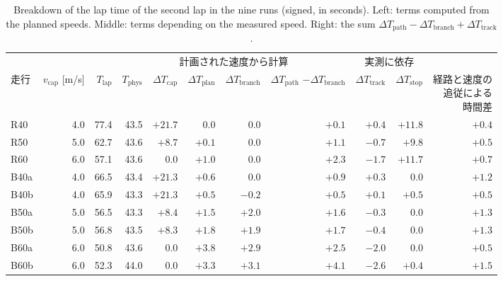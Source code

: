 \begin{table}[!htbp]
  \centering
  \caption[Breakdown of the lap time of the second lap in the nine runs.]{Breakdown of the lap time of the second lap in the nine runs (signed, in seconds). Left: terms computed from the planned speeds. Middle: terms depending on the measured speed. Right: the sum $\Delta T_{\mathrm{path}}-\Delta T_{\mathrm{branch}}+\Delta T_{\mathrm{track}}$.}
  \label{tab:decomp_all}
  \footnotesize
  \begin{lrbox}{\tblbox}\setlength{\tabcolsep}{3pt}\begin{tabular}{lrrrrrrrrrr}
    \toprule
    & & & \multicolumn{5}{c}{計画された速度から計算} & \multicolumn{2}{c}{実測に依存} & \\
    \cmidrule(lr){4-8}\cmidrule(lr){9-10}
    走行 & \shortstack[r]{$v_{\mathrm{cap}}$\\{[m/s]}} & $T_{\mathrm{lap}}$ & $T_{\mathrm{phys}}$ & $\Delta T_{\mathrm{cap}}$ & $\Delta T_{\mathrm{plan}}$ & $\Delta T_{\mathrm{branch}}$ & \shortstack[r]{$\Delta T_{\mathrm{path}}$\\$-\Delta T_{\mathrm{branch}}$} & $\Delta T_{\mathrm{track}}$ & $\Delta T_{\mathrm{stop}}$ & \shortstack[r]{経路と速度の\\追従による\\時間差} \\
    \midrule
    R40 & 4.0 & 77.4 & 43.5 & $+21.7$ & 0.0 & 0.0 & $+0.1$ & $+0.4$ & $+11.8$ & $+0.4$ \\
    R50 & 5.0 & 62.7 & 43.6 & $+8.7$ & $+0.1$ & 0.0 & $+1.1$ & $-0.7$ & $+9.8$ & $+0.5$ \\
    R60 & 6.0 & 57.1 & 43.6 & 0.0 & $+1.0$ & 0.0 & $+2.3$ & $-1.7$ & $+11.7$ & $+0.7$ \\
    \midrule
    B40a & 4.0 & 66.5 & 43.4 & $+21.3$ & $+0.6$ & 0.0 & $+0.9$ & $+0.3$ & 0.0 & $+1.2$ \\
    B40b & 4.0 & 65.9 & 43.3 & $+21.3$ & $+0.5$ & $-0.2$ & $+0.5$ & $+0.1$ & $+0.5$ & $+0.5$ \\
    B50a & 5.0 & 56.5 & 43.3 & $+8.4$ & $+1.5$ & $+2.0$ & $+1.6$ & $-0.3$ & 0.0 & $+1.3$ \\
    B50b & 5.0 & 56.8 & 43.5 & $+8.3$ & $+1.8$ & $+1.9$ & $+1.7$ & $-0.4$ & 0.0 & $+1.3$ \\
    B60a & 6.0 & 50.8 & 43.6 & 0.0 & $+3.8$ & $+2.9$ & $+2.5$ & $-2.0$ & 0.0 & $+0.5$ \\
    B60b & 6.0 & 52.3 & 44.0 & 0.0 & $+3.3$ & $+3.1$ & $+4.1$ & $-2.6$ & $+0.4$ & $+1.5$ \\
    \bottomrule
  \end{tabular}\end{lrbox}\usebox{\tblbox}
\end{table}

